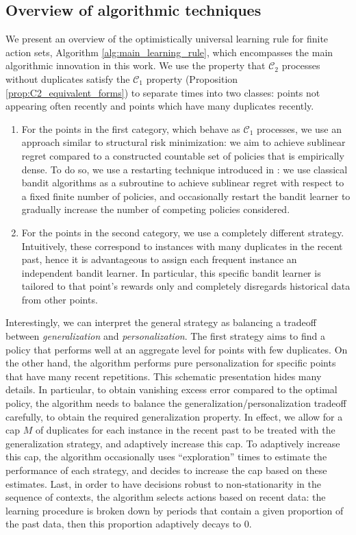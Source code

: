 \documentclass[aos]{imsart}
\theoremstyle{plain}
\theoremstyle{remark}
\newcommand{\Ccal}{\mathcal{C}}
\newcommand{\1}{\mathbbm{1}}%
\begin{document}
\subsection{Overview of algorithmic techniques}
We present an overview of the optimistically universal learning rule for finite action sets, Algorithm \ref{alg:main_learning_rule}, which encompasses the main algorithmic innovation in this work. We use the property that $\Ccal_2$ processes without duplicates satisfy the $\Ccal_1$ property (Proposition \ref{prop:C2_equivalent_forms}) to separate times into two classes: points not appearing often recently and points which have many duplicates recently. 
\begin{enumerate}
    \item For the points in the first category, which behave as $\Ccal_1$ processes, we use an approach similar to structural risk minimization: we aim to achieve sublinear regret compared to a constructed countable set of policies that is empirically dense. To do so, we use a restarting technique introduced in \cite{hanneke:21}: we use classical bandit algorithms as a subroutine to achieve sublinear regret with respect to a fixed finite number of policies, and occasionally restart the bandit learner to gradually increase the number of competing policies considered.
    \item For the points in the second category, we use a completely different strategy. Intuitively, these correspond to instances with many duplicates in the recent past, hence it is advantageous to assign each frequent instance an independent bandit learner. In particular, this specific bandit learner is tailored to that point's rewards only and completely disregards historical data from other points.
\end{enumerate}

Interestingly, we can interpret the general strategy as balancing a tradeoff between \emph{generalization} and \emph{personalization}. The first strategy aims to find a policy that performs well at an aggregate level for points with few duplicates. On the other hand, the algorithm performs pure personalization for specific points that have many recent repetitions. This schematic presentation hides many details. In particular, to obtain vanishing excess error compared to the optimal policy, the algorithm needs to balance the generalization/personalization tradeoff carefully, to obtain the required generalization property. In effect, we allow for a cap $M$ of duplicates for each instance in the recent past to be treated with the generalization strategy, and adaptively increase this cap. To adaptively increase this cap, the algorithm occasionally uses ``exploration'' times to estimate the performance of each strategy, and decides to increase the cap based on these estimates. Last, in order to have decisions robust to non-stationarity in the sequence of contexts, the algorithm selects actions based on recent data: the learning procedure is broken down by periods that contain a given proportion of the past data, then this proportion adaptively decays to $0$.
\end{document}
